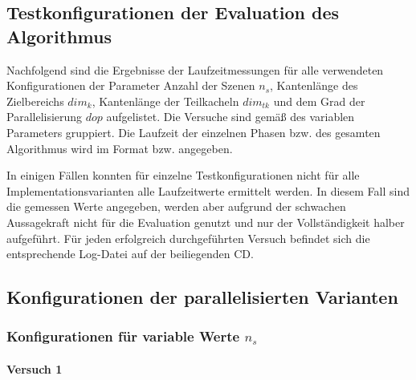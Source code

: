 \begin{appendix}
\chapter{Testkonfigurationen der Evaluation des Algorithmus}
\label{sec:appendixTestConfigurations}
Nachfolgend sind die Ergebnisse der Laufzeitmessungen für alle verwendeten Konfigurationen der Parameter Anzahl der Szenen $n_s$, Kantenlänge des Zielbereichs $dim_k$, Kantenlänge der Teilkacheln $dim_{tk}$ und dem Grad der Parallelisierung $dop$ aufgelistet. Die Versuche sind gemäß des variablen Parameters gruppiert. Die Laufzeit der einzelnen Phasen bzw. des gesamten Algorithmus wird im Format \grqq{} bzw. \grqq{} angegeben. 

In einigen Fällen konnten für einzelne Testkonfigurationen nicht für alle Implementationsvarianten alle Laufzeitwerte ermittelt werden. In diesem Fall sind die gemessen Werte angegeben, werden aber aufgrund der schwachen Aussagekraft nicht für die Evaluation genutzt und nur der Vollständigkeit halber aufgeführt. Für jeden erfolgreich durchgeführten Versuch befindet sich die entsprechende Log-Datei auf der beiliegenden CD.
 
\section{Konfigurationen der parallelisierten Varianten}
\label{app:testsFlink}
\subsection{Konfigurationen für variable Werte $n_s$}
\subsubsection{Versuch 1}


\end{appendix}
